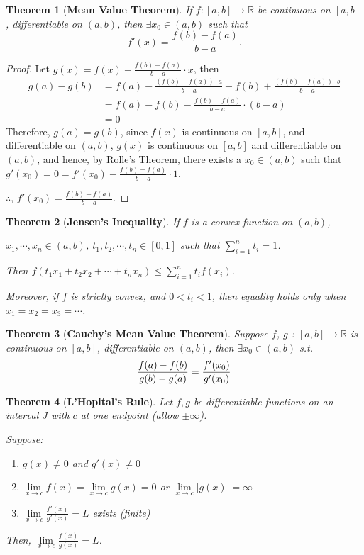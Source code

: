 \documentclass[12pt]{article}
\newcommand{\abs}[1]{\left| #1 \right|}
\theoremstyle{plain}
\newtheorem{theorem}{Theorem}[section]
\newcommand{\dlim}{\displaystyle\lim\limits}
\begin{document}
		\begin{theorem}[\textbf{Mean Value Theorem}]
			If $f:[a,b] \to \mathbb{R}$ be continuous on $[a,b]$, differentiable 
			on $(a,b)$, then $\exists x_0 \in (a,b)$ such that 
			\[
				f'(x) = \frac{f(b)-f(a)}{b-a}.
			\]
		\end{theorem}
		\begin{proof}
			Let $g(x) = f(x)-\frac{f(b)-f(a)}{b-a}\cdot x$, then 
			\begin{align*}
				g(a)-g(b)
				&=f(a)-\frac{(f(b)-f(a))\cdot a}{b-a}
				-f(b)+\frac{(f(b)-f(a))\cdot b}{b-a}\\
				&=f(a)-f(b)-\frac{f(b)-f(a)}{b-a}\cdot(b-a)\\
				&=0
			\end{align*}
			Therefore, $g(a) = g(b)$, 
			since $f(x)$ is continuous on $[a,b]$, and differentiable on $(a,b)$, 
			$g(x)$ is continuous on $[a,b]$ and differentiable on $(a,b)$,
			and hence, by Rolle's Theorem, there exists a $x_0\in (a,b)$ such that
			$g'(x_0)=0 = f'(x_0)-\frac{f(b)-f(a)}{b-a}\cdot 1$,

			$\therefore$, $f'(x_0) = \frac{f(b)-f(a)}{b-a}$.
    \end{proof}
		
		\begin{theorem}[\textbf{Jensen's Inequality}]
			If $f$ is a convex function on $(a,b)$, 
			
			$x_1, \cdots, x_n \in (a,b)$,
			$t_1, t_2, \cdots, t_n \in [0, 1]$ such that $\sum^n_{i=1} t_i = 1$. 

			Then $f(t_1x_1+t_2x_2+\cdots+t_nx_n) \leq \sum^n_{i=1}t_if(x_i)$. 

			Moreover, if $f$ is strictly convex, and $0<t_i<1$, 
			then equality holds only when $x_1 = x_2 = x_3 = \cdots$. \\
		\end{theorem} 

		\begin{theorem}[\textbf{Cauchy's Mean Value Theorem}]
			Suppose $f$, $g$ : $[a,b] \to\mathbb{R}$ is continuous on $[a,b]$, 
			differentiable on $(a,b)$,
			then $\exists x_0\in(a,b)$ s.t. 
			\[
				\frac{f(a)-f(b)}{g(b)-g(a)} = \frac{f'(x_0)}{g'(x_0)}\\
			\]
		\end{theorem}

		\begin{theorem}[\textbf{L'Hopital's Rule}]
			Let $f,g$ be differentiable functions on an interval $J$ with
			$c$ at one endpoint (allow $\pm \infty$). 

			Suppose:
			\begin{enumerate}
				\item $g(x)\neq 0$ and $g'(x) \neq 0$
				\item $\dlim_{x\to c} f(x) = \dlim_{x\to c}g(x) = 0$ or 
							$\dlim_{x\to c}\abs{g(x)} = \infty$
				\item $\dlim_{x\to c} \frac{f'(x)}{g'(x)} = L$ exists (finite)
			\end{enumerate}
			Then, $\dlim_{x\to c} \frac{f(x)}{g(x)} = L$.\\
		\end{theorem}
\end{document}
